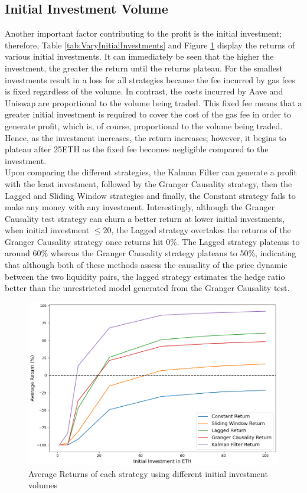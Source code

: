 \subsection{Initial Investment Volume}
Another important factor contributing to the profit is the initial investment; therefore, Table \ref{tab:VaryInitialInvestments} and Figure \ref{fig:VaryInitialInvestments} display the returns of various initial investments. It can immediately be seen that the higher the investment, the greater the return until the returns plateau. For the smallest investments result in a loss for all strategies because the fee incurred by gas fees is fixed regardless of the volume. In contrast, the costs incurred by Aave and Uniswap are proportional to the volume being traded. This fixed fee means that a greater initial investment is required to cover the cost of the gas fee in order to generate profit, which is, of course, proportional to the volume being traded. Hence, as the investment increases, the return increases; however, it begins to plateau after 25ETH as the fixed fee becomes negligible compared to the investment.
\\[3mm]
Upon comparing the different strategies, the Kalman Filter can generate a profit with the least investment, followed by the Granger Causality strategy, then the Lagged and Sliding Window strategies and finally, the Constant strategy fails to make any money with any investment. Interestingly, although the Granger Causality test strategy can churn a better return at lower initial investments, when initial investment $\leq 20$, the Lagged strategy overtakes the returns of the Granger Causality strategy once returns hit 0\%. The Lagged strategy plateaus to around 60\% whereas the Granger Causality strategy plateaus to 50\%, indicating that although both of these methods assess the causality of the price dynamic between the two liquidity pairs, the lagged strategy estimates the hedge ratio better than the unrestricted model generated from the Granger Causality test.

\begin{figure}[H]
    \centering
    \includegraphics[width=\linewidth]{evaluation/Images/VaryII.png}
    \caption{Average Returns of each strategy using different initial investment volumes}
    \label{fig:VaryInitialInvestments}
\end{figure}

